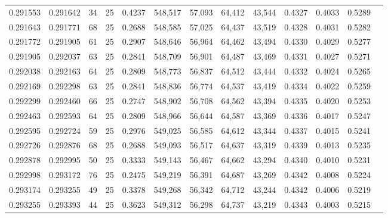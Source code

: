 \begin{tabular}{rrrrrrrrrrrrr}
0.291553 & 0.291642 &    34 &  25 &                                     0.4237 & 548,517 &  57,093 &  64,412 &  43,544 & 0.4327 & 0.4033 & 0.5289 \\
0.291643 & 0.291771 &    68 &  25 &                                     0.2688 & 548,585 &  57,025 &  64,437 &  43,519 & 0.4328 & 0.4031 & 0.5282 \\
0.291772 & 0.291905 &    61 &  25 &                                     0.2907 & 548,646 &  56,964 &  64,462 &  43,494 & 0.4330 & 0.4029 & 0.5277 \\
0.291905 & 0.292037 &    63 &  25 &                                     0.2841 & 548,709 &  56,901 &  64,487 &  43,469 & 0.4331 & 0.4027 & 0.5271 \\
0.292038 & 0.292163 &    64 &  25 &                                     0.2809 & 548,773 &  56,837 &  64,512 &  43,444 & 0.4332 & 0.4024 & 0.5265 \\
0.292169 & 0.292298 &    63 &  25 &                                     0.2841 & 548,836 &  56,774 &  64,537 &  43,419 & 0.4334 & 0.4022 & 0.5259 \\
0.292299 & 0.292460 &    66 &  25 &                                     0.2747 & 548,902 &  56,708 &  64,562 &  43,394 & 0.4335 & 0.4020 & 0.5253 \\
0.292463 & 0.292593 &    64 &  25 &                                     0.2809 & 548,966 &  56,644 &  64,587 &  43,369 & 0.4336 & 0.4017 & 0.5247 \\
0.292595 & 0.292724 &    59 &  25 &                                     0.2976 & 549,025 &  56,585 &  64,612 &  43,344 & 0.4337 & 0.4015 & 0.5241 \\
0.292726 & 0.292876 &    68 &  25 &                                     0.2688 & 549,093 &  56,517 &  64,637 &  43,319 & 0.4339 & 0.4013 & 0.5235 \\
0.292878 & 0.292995 &    50 &  25 &                                     0.3333 & 549,143 &  56,467 &  64,662 &  43,294 & 0.4340 & 0.4010 & 0.5231 \\
0.292998 & 0.293172 &    76 &  25 &                                     0.2475 & 549,219 &  56,391 &  64,687 &  43,269 & 0.4342 & 0.4008 & 0.5224 \\
0.293174 & 0.293255 &    49 &  25 &                                     0.3378 & 549,268 &  56,342 &  64,712 &  43,244 & 0.4342 & 0.4006 & 0.5219 \\
0.293255 & 0.293393 &    44 &  25 &                                     0.3623 & 549,312 &  56,298 &  64,737 &  43,219 & 0.4343 & 0.4003 & 0.5215 \\

\end{tabular}
